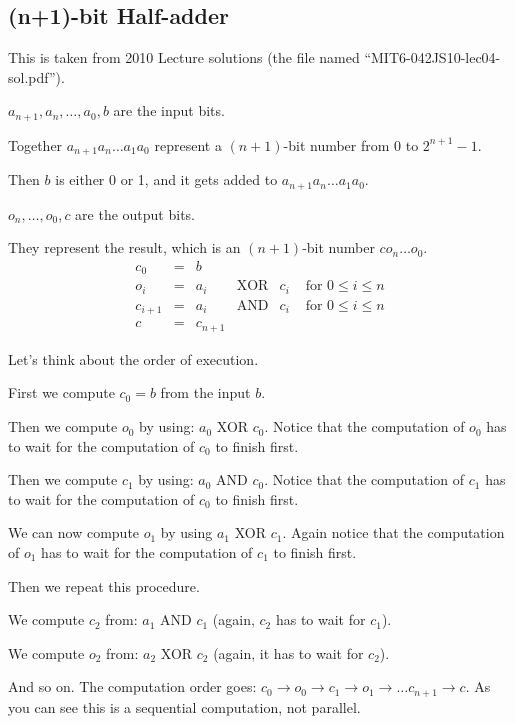 \documentclass[14pt]{extarticle}
\begin{document}
\subsection{(n+1)-bit Half-adder}
This is taken from 2010 Lecture solutions (the file named ``MIT6-042JS10-lec04-sol.pdf'').

$a_{n+1}, a_n, \ldots, a_0, b$ are the input bits. 

Together $a_{n+1}a_n\ldots a_1a_0$ represent a $(n+1)$-bit number from 0 to $2^{n+1} - 1$. 

Then $b$ is either 0 or 1, and it gets added to $a_{n+1}a_n\ldots a_1a_0$.

$o_n, \ldots, o_0, c$ are the output bits. 

They represent the result, which is an $(n+1)$-bit number $co_n\ldots o_0$.
$$
\begin{array}{cccccc}
c_0     & = &  b  &            &     &  \\
o_i     & = & a_i & \text{XOR} & c_i & \text{ for } 0 \leq i \leq n \\
c_{i+1} & = & a_i & \text{AND} & c_i & \text{ for } 0 \leq i \leq n \\
c   & = & c_{n+1} &            &     &  
\end{array}
$$

Let's think about the order of execution.

First we compute $c_0 = b$ from the input $b$.

Then we compute $o_0$ by using: $a_0$ XOR $c_0$. Notice that the computation of $o_0$ has to wait for the computation of $c_0$ to finish first.

Then we compute $c_1$ by using: $a_0$ AND $c_0$. Notice that the computation of $c_1$ has to wait for the computation of $c_0$ to finish first.

We can now compute $o_1$ by using $a_1$ XOR $c_1$. Again notice that the computation of $o_1$ has to wait for the computation of $c_1$ to finish first.

Then we repeat this procedure.

We compute $c_2$ from: $a_1$ AND $c_1$ (again, $c_2$ has to wait for $c_1$).

We compute $o_2$ from: $a_2$ XOR $c_2$ (again, it has to wait for $c_2$).

And so on. The computation order goes: $c_0 \rightarrow o_0 \rightarrow c_1 \rightarrow o_1 \rightarrow \ldots c_{n+1} \rightarrow c$. As you can see this is a sequential computation, not parallel.
\end{document}
